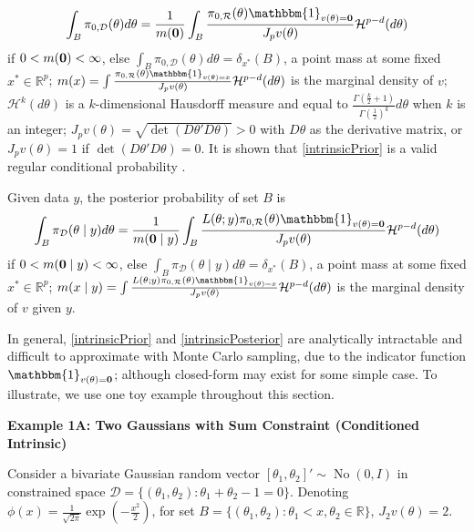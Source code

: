 \documentclass[10pt]{article}
\newcommand{\bb}[1]{\mathbb{#1}}
\newcommand{\mc}[1]{\mathcal{#1}}
\DeclareMathOperator{\No}{No}
\DeclareMathOperator{\1}{\mathbbm{1}}
\begin{document}
\begin{equation}
\label{intrinsicPrior}
	\int_{B}\pi_{0,\mc D}(\theta)d\theta= \frac{1}{m(\bf 0)}\int_{B} \frac{\pi_{0,\mc R}(\theta) \mathbbm{1}_{v({\theta})={\bf 0}}}{J_p v(\theta)}\mc H^{p-d}(d\theta)
\end{equation}
if $0<m(\bf 0)<\infty$, else $\int_{B}\pi_{0,\mc D}(\theta)d\theta= \delta_{x^*}(B)$, a point mass at some fixed $x^{*}\in \bb R^p$; $m(x)= \int \frac{\pi_{0,\mc R}(\theta)\mathbbm{1}_{v({\theta})=x}}{J_p v(\theta)}\mc H^{p-d}(d\theta)$ is the marginal density of $v$; $\mc H^{k}(d\theta)$ is a $k$-dimensional Hausdorff measure and equal to $\frac{\Gamma(\frac{k}{2}+1)}{\Gamma(\frac{1}{2})^k} d\theta$ when $k$ is an integer;  $J_p v(\theta) = \sqrt{\det (D\theta' D\theta)}>0$  with $D\theta$ as the derivative matrix, or $J_p v(\theta) =1$ if $\det (D\theta' D\theta)=0$. It is shown that \eqref{intrinsicPrior} is a valid regular conditional probability \citep{diaconis2013manifold}.

Given data $y$, the posterior probability of set $B$ is
\begin{equation}
\label{intrinsicPosterior}
	\int_{B}\pi_{\mc D}(\theta \mid y)d\theta= \frac{1}{m({\bf 0} \mid y)}\int_{B} \frac{L(\theta;y)\pi_{0,\mc R}(\theta) \mathbbm{1}_{v({\theta})={\bf 0}}}{J_p v(\theta)}\mc H^{p-d}(d\theta)
\end{equation}
if $0<m({\bf 0} \mid y)<\infty$, else $\int_{B}\pi_{\mc D}(\theta \mid y)d\theta= \delta_{x^*}(B)$, a point mass at some fixed $x^{*}\in \bb R^p$; $m(x\mid y)= \int \frac{L(\theta;y)\pi_{0,\mc R}(\theta)\mathbbm{1}_{v({\theta})=x}}{J_p v(\theta)}\mc H^{p-d}(d\theta)$ is the marginal density of $v$ given $y$.

In general, \eqref{intrinsicPrior} and \eqref{intrinsicPosterior} are analytically intractable and difficult to approximate with Monte Carlo sampling, due to the indicator function $\mathbbm{1}_{v({\theta})={\bf 0}}$; although closed-form may exist for some simple case. To illustrate, we use one toy example throughout this section.

{\bf Example 1A: Two Gaussians with Sum Constraint (Conditioned Intrinsic)}

Consider a bivariate Gaussian random vector $[\theta_1,\theta_2]' \sim \No(0,I)$ in constrained space $\mc D=\{(\theta_1,\theta_2):\theta_1+\theta_2-1=0\}$. Denoting $\phi(x)= \frac{1}{\sqrt{2\pi}} \exp(-\frac{x^2}{2})$, for set $B= \{(\theta_1,\theta_2): \theta_1< x, \theta_2\in \mathbb R\}$, $J_2v(\theta)=2$.
\end{document}
